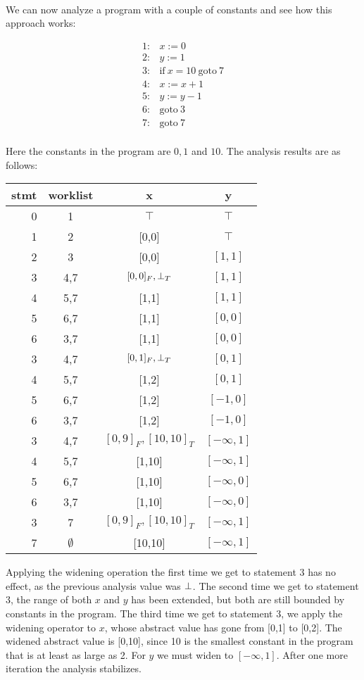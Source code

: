 \documentclass[11pt]{article}
\def\tablespace{\vspace{2ex}}
\begin{document}
\begin{sloppypar}
\[\begin{array}{lll}
\end{array}
\]

We can now analyze a program with a couple of constants and see how this approach works:

\[
\begin{array}{ll}
1: & x := 0\\
2: & y := 1\\
3: & \mbox{if}~x=10~\mbox{goto}~7\\
4: & x := x + 1\\
5: & y := y - 1\\
6: & \mbox{goto}~3\\
7: & \mbox{goto}~7\\
\end{array}
\]

Here the constants in the program are $0,1$ and $10$.
The analysis results are as follows:

\tablespace
\begin{tabular}{r | c | c c}

stmt & worklist & x & y \\
\hline
0  & 1   & $\top$ & $\top$ \\
1  & 2   & [0,0] & $\top$ \\
2  & 3   & [0,0] & $[1,1]$ \\
3  & 4,7 & $[0,0]_F, \bot_T$ & $[1,1]$ \\
4  & 5,7 & [1,1] & $[1,1]$ \\
5  & 6,7 & [1,1] & $[0,0]$ \\
6  & 3,7 & [1,1] & $[0,0]$ \\
3  & 4,7 & $[0,1]_F, \bot_T$ & $[0,1]$ \\
4  & 5,7 & [1,2] & $[0,1]$ \\
5  & 6,7 & [1,2] & $[-1,0]$ \\
6  & 3,7 & [1,2] & $[-1,0]$ \\
3  & 4,7 & $[0,9]_F,[10,10]_T$ & $[-\infty,1]$ \\
4  & 5,7 & [1,10] & $[-\infty,1]$ \\
5  & 6,7 & [1,10] & $[-\infty,0]$ \\
6  & 3,7 & [1,10] & $[-\infty,0]$ \\
3  & 7 & $[0,9]_F,[10,10]_T$ & $[-\infty,1]$ \\
7  & $\emptyset$ & [10,10] & $[-\infty,1]$ \\

\end{tabular}
\tablespace

Applying the widening operation the first time we get to statement 3 has no effect, as the previous analysis value was $\bot$.  The second time we get to statement 3, the range of both $x$ and $y$ has been extended, but both are still bounded by constants in the program.  The third time we get to statement 3, we apply the widening operator to $x$, whose abstract value has gone from [0,1] to [0,2].  The widened abstract value is [0,10], since 10 is the smallest constant in the program that is at least as large as 2.  For $y$ we must widen to $[-\infty,1]$.  After one more iteration the analysis stabilizes.


\end{sloppypar}
\end{document}
